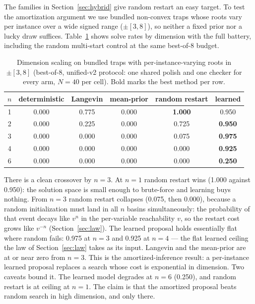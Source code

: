 \documentclass[11pt]{article}
\begin{document}
The families in Section~\ref{sec:hybrid} give random restart an easy target. To test the
amortization argument we use bundled non-convex traps whose roots vary per instance over a
wide signed range ($\pm[3,8]$), so neither a fixed prior nor a lucky draw suffices.
Table~\ref{tab:scaling} shows solve rates by dimension with the full battery, including the
random multi-start control at the same best-of-8 budget.

\begin{table}[t]
\centering
\caption{Dimension scaling on bundled traps with per-instance-varying roots in $\pm[3,8]$
(best-of-8, unified-v2 protocol: one shared polish and one checker for every arm, $N{=}40$
per cell). Bold marks the best method per row.}
\label{tab:scaling}
\begin{tabular}{cccccc}
\toprule
$n$ & deterministic & Langevin & mean-prior & random restart & learned \\
\midrule
1 & 0.000 & 0.775 & 0.000 & \textbf{1.000} & 0.950 \\
2 & 0.000 & 0.225 & 0.000 & 0.725 & \textbf{0.950} \\
3 & 0.000 & 0.000 & 0.000 & 0.075 & \textbf{0.975} \\
4 & 0.000 & 0.000 & 0.000 & 0.000 & \textbf{0.925} \\
6 & 0.000 & 0.000 & 0.000 & 0.000 & \textbf{0.250} \\
\bottomrule
\end{tabular}
\end{table}

There is a clean crossover by $n = 3$. At $n = 1$ random restart wins (1.000 against 0.950):
the solution space is small enough to brute-force and learning buys nothing. From
$n = 3$ random restart collapses (0.075, then 0.000), because a random initialization must
land in all $n$ basins simultaneously: the probability of that event decays like $v^n$ in the
per-variable reachability $v$, so the restart cost grows like $v^{-n}$
(Section~\ref{sec:law}). The learned
proposal holds essentially flat where random fails: 0.975 at $n = 3$ and 0.925 at $n = 4$ ---
the flat learned ceiling the law of Section~\ref{sec:law} takes as its input. Langevin and the
mean-prior are at or near zero from $n = 3$. This is the amortized-inference result: a
per-instance learned proposal replaces a search whose cost is exponential in dimension. Two
caveats bound it. The learned model degrades at $n = 6$ (0.250), and random restart is at
ceiling at $n = 1$. The claim is that the amortized proposal beats random search in high
dimension, and only there.
\end{document}
